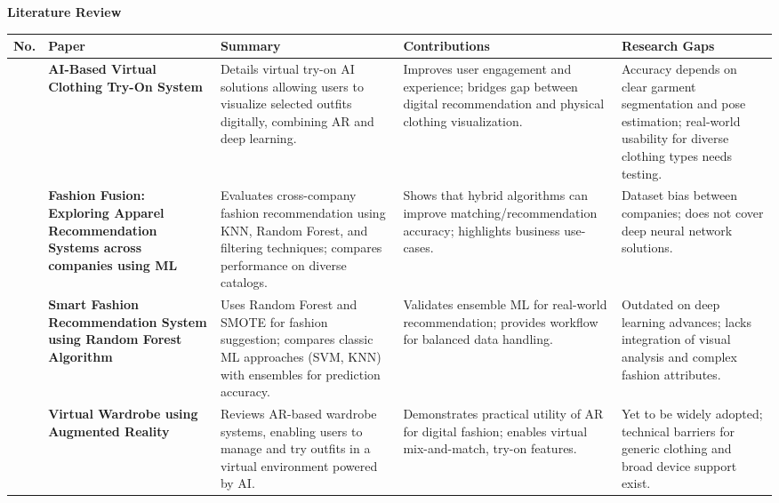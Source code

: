 \documentclass[11pt,aspectratio=169,notes,mathserif]{beamer}
\begin{document}
\begin{frame}[allowframebreaks]{\textbf{Literature Review}}
\tiny
\begin{table}
	\centering
	\begin{tabular}{|>{\centering\arraybackslash}p{0.5cm}|p{3cm}|p{3.5cm}|p{2.5cm}|p{2.5cm}|}
		\hline
		\textbf{No.} & \textbf{Paper} & \textbf{Summary} & \textbf{Contributions} & \textbf{Research Gaps} \\
		\hline
		5 & \textbf{AI-Based Virtual Clothing Try-On System} & Details virtual try-on AI solutions allowing users to visualize selected outfits digitally, combining AR and deep learning. & Improves user engagement and experience; bridges gap between digital recommendation and physical clothing visualization. & Accuracy depends on clear garment segmentation and pose estimation; real-world usability for diverse clothing types needs testing. \\
		\hline
		6 & \textbf{Fashion Fusion: Exploring Apparel Recommendation Systems across companies using ML} & Evaluates cross-company fashion recommendation using KNN, Random Forest, and filtering techniques; compares performance on diverse catalogs. & Shows that hybrid algorithms can improve matching/recommendation accuracy; highlights business use-cases. & Dataset bias between companies; does not cover deep neural network solutions. \\
		\hline
		7 & \textbf{Smart Fashion Recommendation System using Random Forest Algorithm} & Uses Random Forest and SMOTE for fashion suggestion; compares classic ML approaches (SVM, KNN) with ensembles for prediction accuracy. & Validates ensemble ML for real-world recommendation; provides workflow for balanced data handling. & Outdated on deep learning advances; lacks integration of visual analysis and complex fashion attributes. \\
		\hline
		8 & \textbf{Virtual Wardrobe using Augmented Reality} & Reviews AR-based wardrobe systems, enabling users to manage and try outfits in a virtual environment powered by AI. & Demonstrates practical utility of AR for digital fashion; enables virtual mix-and-match, try-on features. & Yet to be widely adopted; technical barriers for generic clothing and broad device support exist. \\
		\hline
	\end{tabular}
\end{table}
\end{frame}

\end{document}
